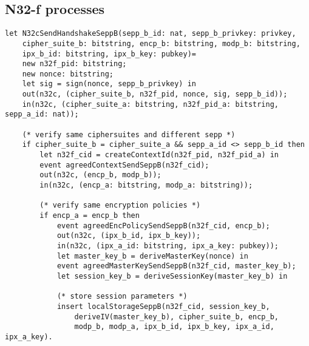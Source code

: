 \subsection{N32-f processes}

\begin{lstlisting}
let N32cSendHandshakeSeppB(sepp_b_id: nat, sepp_b_privkey: privkey,
    cipher_suite_b: bitstring, encp_b: bitstring, modp_b: bitstring,
    ipx_b_id: bitstring, ipx_b_key: pubkey)=
    new n32f_pid: bitstring;
    new nonce: bitstring;
    let sig = sign(nonce, sepp_b_privkey) in
    out(n32c, (cipher_suite_b, n32f_pid, nonce, sig, sepp_b_id));
    in(n32c, (cipher_suite_a: bitstring, n32f_pid_a: bitstring, sepp_a_id: nat));

    (* verify same ciphersuites and different sepp *)
    if cipher_suite_b = cipher_suite_a && sepp_a_id <> sepp_b_id then
        let n32f_cid = createContextId(n32f_pid, n32f_pid_a) in
        event agreedContextSendSeppB(n32f_cid);
        out(n32c, (encp_b, modp_b));
        in(n32c, (encp_a: bitstring, modp_a: bitstring));

        (* verify same encryption policies *)
        if encp_a = encp_b then
            event agreedEncPolicySendSeppB(n32f_cid, encp_b);
            out(n32c, (ipx_b_id, ipx_b_key));
            in(n32c, (ipx_a_id: bitstring, ipx_a_key: pubkey));
            let master_key_b = deriveMasterKey(nonce) in
            event agreedMasterKeySendSeppB(n32f_cid, master_key_b);
            let session_key_b = deriveSessionKey(master_key_b) in

            (* store session parameters *)
            insert localStorageSeppB(n32f_cid, session_key_b,
                deriveIV(master_key_b), cipher_suite_b, encp_b,
                modp_b, modp_a, ipx_b_id, ipx_b_key, ipx_a_id, ipx_a_key).
\end{lstlisting}


